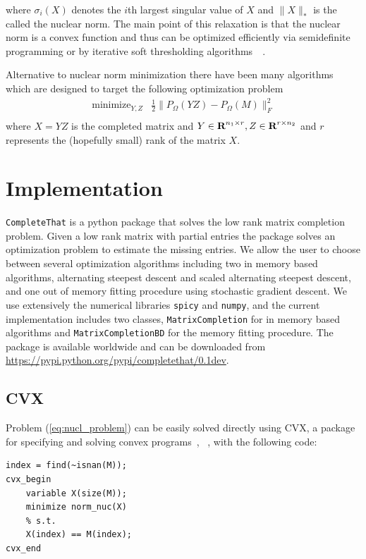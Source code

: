 \documentclass[12pt]{article}
\begin{document}
where $\sigma_i(X)$ denotes the $i$th largest singular value of $X$ and $\|X\|_*$ is the called the nuclear norm. The main point of this relaxation is that the nuclear norm is a convex function and thus can be optimized efficiently via semidefinite programming or by iterative soft thresholding algorithms~\cite{cai:2010}~\cite{goldfarb:2011}.

Alternative to nuclear norm minimization there have been many algorithms which are designed to target the following optimization problem
\begin{equation}
    \begin{array}{ll}
    \mbox{minimize}_{Y,Z}   & \frac{1}{2} \|P_{\Omega}(YZ) - P_{\Omega}(M)\|^2_F \\
    \end{array}
    \label{eq:frob_problem}
\end{equation}
where $X=YZ$ is the completed matrix and $Y\in {\mbox{\bf R}}^{n_1\times r}, Z\in {\mbox{\bf R}}^{r\times n_2}$ and $r$ represents the (hopefully small) rank of the matrix $X$.

\section{Implementation}
\texttt{CompleteThat} is a python package that solves the low rank matrix completion problem. Given a low rank matrix with partial entries the package solves an optimization problem to estimate the missing entries. We allow the user to choose between several optimization algorithms including two in memory based algorithms, alternating steepest descent and scaled alternating steepest descent, and one out of memory fitting procedure using stochastic gradient descent. We use extensively the numerical libraries \texttt{spicy} and \texttt{numpy}, and the current implementation includes two classes, \texttt{MatrixCompletion} for in memory based algorithms and \texttt{MatrixCompletionBD} for the memory fitting procedure. The package is available worldwide and can be
downloaded from \url{https://pypi.python.org/pypi/completethat/0.1dev}.

\subsection*{CVX}
Problem (\ref{eq:nucl_problem}) can be easily solved directly using CVX, a package for specifying and solving convex programs~\cite{cvx}, ~\cite{gb08}, with the following code:

\begin{verbatim}
index = find(~isnan(M));
cvx_begin
    variable X(size(M));
    minimize norm_nuc(X)
    % s.t.
    X(index) == M(index);
cvx_end
\end{verbatim}
\end{document}
